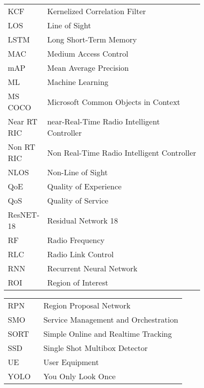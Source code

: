 \begin{flushleft}
\begin{tabular}{l p{0.8\linewidth}}
        KCF & Kernelized Correlation Filter \\
        LOS & Line of Sight \\
        LSTM & Long Short-Term Memory \\
        MAC & Medium Access Control \\
        mAP & Mean Average Precision \\
        ML & Machine Learning \\
        MS COCO & Microsoft Common Objects in Context \\
        Near RT RIC & near-Real-Time Radio Intelligent Controller\\
        Non RT RIC & Non Real-Time Radio Intelligent Controller \\
        NLOS & Non-Line of Sight \\
        QoE & Quality of Experience \\
        QoS & Quality of Service \\
        ResNET-18 & Residual Network 18 \\
        RF & Radio Frequency \\
        RLC & Radio Link Control \\
        RNN & Recurrent Neural Network \\
        ROI & Region of Interest \\
  
    \end{tabular}
\end{flushleft}

\begin{flushleft}
    \begin{tabular}{l p{0.8\linewidth}}
      RPN & Region Proposal Network \\
        SMO & Service Management and Orchestration \\
        SORT & Simple Online and Realtime Tracking \\
        SSD & Single Shot Multibox Detector \\
        UE & User Equipment \\
        YOLO & You Only Look Once \\
    \end{tabular}
\end{flushleft}



